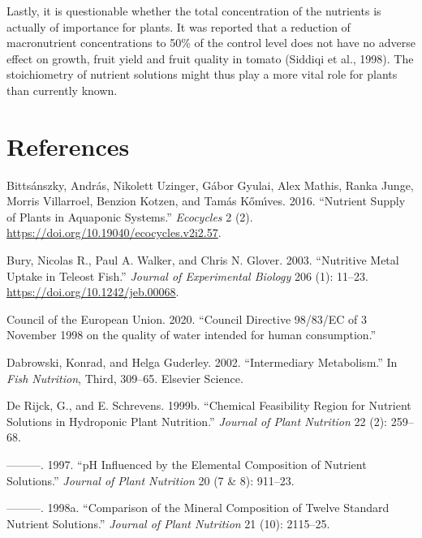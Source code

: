\documentclass[
]{article}
\newlength{\cslhangindent}
\newlength{\cslentryspacingunit} %
\newenvironment{CSLReferences}[2] %
 {%
  \setlength{\parindent}{0pt}
  \ifodd #1
  \let\oldpar\par
  \def\par{\hangindent=\cslhangindent\oldpar}
  \fi
  \setlength{\parskip}{#2\cslentryspacingunit}
 }%
 {}
\begin{document}
Lastly, it is questionable whether the total concentration of the nutrients is actually of importance for plants. It was reported that a reduction of macronutrient concentrations to 50\% of the control level does not have no adverse effect on growth, fruit yield and fruit quality in tomato (Siddiqi et al., 1998). The stoichiometry of nutrient solutions might thus play a more vital role for plants than currently known.

\hypertarget{references}{%
\section*{References}\label{references}}

\hypertarget{refs}{}
\begin{CSLReferences}{1}{0}
\leavevmode{}%
Bittsánszky, András, Nikolett Uzinger, Gábor Gyulai, Alex Mathis, Ranka Junge, Morris Villarroel, Benzion Kotzen, and Tamás Kőmı́ves. 2016. {``Nutrient Supply of Plants in Aquaponic Systems.''} \emph{Ecocycles} 2 (2). \url{https://doi.org/10.19040/ecocycles.v2i2.57}.

\leavevmode{}%
Bury, Nicolas R., Paul A. Walker, and Chris N. Glover. 2003. {``Nutritive Metal Uptake in Teleost Fish.''} \emph{Journal of Experimental Biology} 206 (1): 11--23. \url{https://doi.org/10.1242/jeb.00068}.

\leavevmode{}%
Council of the European Union. 2020. {``{Council Directive 98/83/EC of 3 November 1998 on the quality of water intended for human consumption}.''}

\leavevmode{}%
Dabrowski, Konrad, and Helga Guderley. 2002. {``{Intermediary Metabolism}.''} In \emph{Fish Nutrition}, Third, 309--65. Elsevier Science.

\leavevmode{}%
De Rijck, G., and E. Schrevens. 1999b. {``Chemical Feasibility Region for Nutrient Solutions in Hydroponic Plant Nutrition.''} \emph{Journal of Plant Nutrition} 22 (2): 259--68.

\leavevmode{}%
---------. 1997. {``pH Influenced by the Elemental Composition of Nutrient Solutions.''} \emph{Journal of Plant Nutrition} 20 (7 \& 8): 911--23.

\leavevmode{}%
---------. 1998a. {``Comparison of the Mineral Composition of Twelve Standard Nutrient Solutions.''} \emph{Journal of Plant Nutrition} 21 (10): 2115--25.


\end{CSLReferences}
\end{document}

